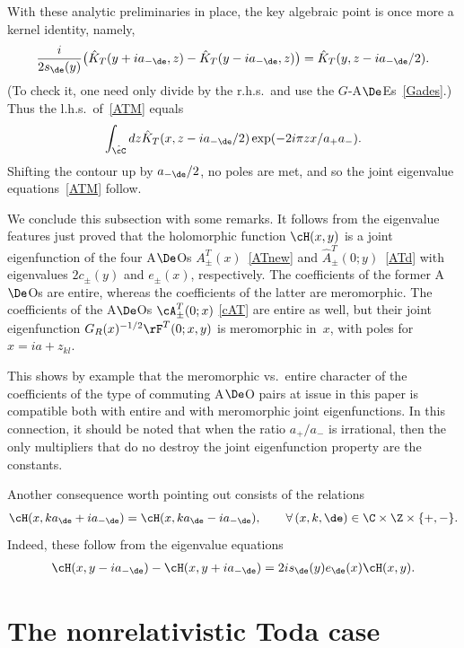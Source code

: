 \documentclass[pdftex]{sigma}
\numberwithin{equation}{section}
\begin{document}
With these analytic preliminaries in place, the key algebraic point is once more a kernel identity, namely,
\begin{gather}\label{Kdid}
\frac{i}{2s_{\de}(y)}\big(\hat{K}_T(y+ia_{-\de},z)-\hat{K}_T(y-ia_{-\de},z)\big)=\hat{K}_T(y,z-ia_{-\de}/2).
\end{gather}
(To check it, one need only divide by the r.h.s.\ and use the $G$-A$\De$Es~\eqref{Gades}.) Thus the l.h.s.\ of~\eqref{ATM}
equals
\begin{gather}
\int_{\hat{\cC}}dz\hat{K}_T(x,z-ia_{-\de}/2)\exp(-2i\pi zx/a_+a_-).
\end{gather}
Shifting the contour
up by $a_{-\de}/2$, no poles are met, and so the joint eigenvalue equations~\eqref{ATM} follow.

{\sloppy We conclude this subsection with some remarks.  It follows from the eigenvalue features just proved that the holomorphic function $\cH(x,y)$ is a joint eigenfunction of the four A$\De$Os $A^T_{\pm}(x)$~\eqref{ATnew} and $\hat{A}^T_{\pm}(0;y)$~\eqref{ATd} with eigenvalues $2c_{\pm}(y)$ and $e_{\pm}(x)$, respectively. The coef\/f\/icients of the former A$\De$Os are entire, whereas the coef\/f\/icients of the latter are meromorphic. The coef\/f\/icients of the A$\De$Os $\cA^T_{\pm}(0;x)$ \eqref{cAT} are entire as well, but their joint eigenfunction $G_R(x)^{-1/2}\rF^T(0;x,y)$ is meromorphic in~$x$, with poles for $x=ia+z_{kl}$.

}

This shows by example that the meromorphic vs.~entire character of the coef\/f\/icients of the type of commuting A$\De$O pairs at issue in this paper is compatible both with entire and with meromorphic joint eigenfunctions. In this connection, it should be noted that when the ratio $a_+/a_-$ is irrational, then the only multipliers that do no destroy the joint eigenfunction property are the constants.

Another consequence worth pointing out consists of the relations
\begin{gather}
\cH(x,ka_{\de}+ia_{-\de})=\cH(x,ka_{\de}-ia_{-\de}),\qquad \forall \, (x,k,\de)\in\C\times\Z\times\{ +,-\}.
\end{gather}
Indeed, these follow from the eigenvalue equations
\begin{gather}
\cH(x,y-ia_{-\de})-\cH(x,y+ia_{-\de})=2is_{\de}(y)e_{\de}(x)\cH(x,y).
\end{gather}




\section{The nonrelativistic Toda case}\label{section6}
\end{document}
